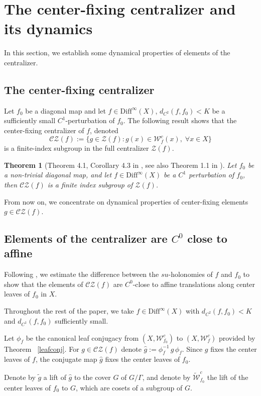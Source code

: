 \documentclass[11pt]{amsart}
\numberwithin{equation}{section}
\newcommand{\W}{\mathcal{W}}
\newcommand{\CZ}{\mathcal{CZ}}
\theoremstyle{plain}
\newtheorem{thm}{Theorem}[section]
\begin{document}
\section{The center-fixing centralizer and its dynamics }\label{sec:cla}
In this section, we establish some dynamical properties of elements of the centralizer.
\subsection{The center-fixing centralizer}

Let $f_0$ be a diagonal map and let $f\in \mathrm{Diff}^\infty(X)$, $d_{C^2}(f,f_0)<K$ be a sufficiently small $C^1$-perturbation of $f_0$. The following result shows that the center-fixing centralizer of $f$, denoted \[\CZ(f):=\{g\in \mathcal Z(f): g(x)\in \W^c_f(x),\;\forall x\in X\}\] is a finite-index subgroup in the full centralizer $\mathcal Z(f)$.

\begin{thm}[Theorem 4.1, Corollary 4.3 in \cite{Wang}, see also Theorem 1.1 in \cite{Witte}]
   Let $f_0$ be a non-trivial diagonal map, and let $f\in \mathrm{Diff}^\infty(X)$ be a $C^1$ perturbation of $f_0$, then $\CZ(f)$ is a finite index subgroup of $\mathcal Z(f)$.
\end{thm}

From now on, we concentrate on dynamical properties of center-fixing elements $g\in \CZ(f)$.


\subsection{\texorpdfstring{Elements of the centralizer are $C^0$ close to
affine}{Elements of the centralizer are C0 close to affine}}
Following \cite{Wang26}, we estimate the difference between the $su$-holonomies
of $f$ and $f_0$ to show that the elements of $\CZ(f)$ are $C^0$-close to affine
translations along center leaves of $f_0$ in $X$.

 Throughout the rest of the paper, we take $f\in \mathrm{Diff}^\infty(X)$ with $d_{C^2}(f,f_0)<K$ and $d_{C^1}(f,f_0)$ sufficiently small.
 
 Let $\phi_f$ be the  canonical leaf
conjugacy from $(X,\mathcal W^c_{f_0})$ to $(X,\mathcal W^c_f)$
provided by Theorem ~\ref{leafconj}. For
$g\in\CZ(f)$ denote  $\hat g:=\phi_f^{-1}\,g\,\phi_f$. Since $g$ fixes the
center leaves of $f$, the conjugate map $\hat g$ fixes the center leaves of $f_0$.

Denote by $\tilde g$ a lift of $\hat g$ to the cover $G$ of $G/\Gamma$,
and denote by $\widetilde{\mathcal W}^c_{f_0}$ the lift of the center leaves of
$f_0$ to $G$, which are cosets of a subgroup of $G$.
\end{document}

